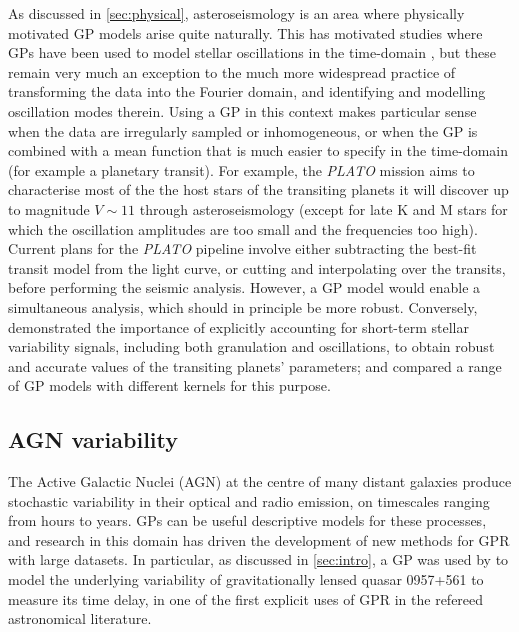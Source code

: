 \documentclass[letterpaper]{ar-1col}
\begin{document}
As discussed in \autoref{sec:physical}, asteroseismology is an area where physically motivated GP models arise quite naturally. This has motivated studies where GPs have been used to model stellar oscillations in the time-domain \citep{2017AJ....154..254G, 2018ApJ...865L..20F}, but these remain very much an exception to the much more widespread practice of transforming the data into the Fourier domain, and identifying and modelling oscillation modes therein. Using a GP in this context makes particular sense when the data are irregularly sampled or inhomogeneous, or when the GP is combined with a mean function that is much easier to specify in the time-domain (for example a planetary transit). For example, the \textit{PLATO} mission \citep{2014ExA....38..249R} aims to characterise most of the the host stars of the transiting planets it will discover up to magnitude $V \sim 11$ through asteroseismology (except for late K and M stars for which the oscillation amplitudes are too small and the frequencies too high). Current plans for the \textit{PLATO} pipeline involve either subtracting the best-fit transit model from the light curve, or cutting and interpolating over the transits, before performing the seismic analysis. However, a GP model would  enable a simultaneous analysis, which should in principle be more robust. Conversely, \citet{2020A&A...634A..75B} demonstrated the importance of 
explicitly accounting for short-term stellar variability signals, including both granulation and oscillations, to obtain robust and accurate values of the transiting planets' parameters; and compared a range of GP models with different kernels for this purpose.

\subsection{AGN variability}

The Active Galactic Nuclei (AGN) at the centre of many distant galaxies produce stochastic variability in their optical and radio emission, on timescales ranging from hours to years.
GPs can be useful descriptive models for these processes, and research in this domain has driven the development of new methods for GPR with large datasets.
In particular, as discussed in \autoref{sec:intro}, a GP was used by \citet{prh92a} to model the underlying variability of gravitationally lensed quasar 0957+561 to measure its time delay, in one of the first explicit uses of GPR in the refereed astronomical literature.
\end{document}
